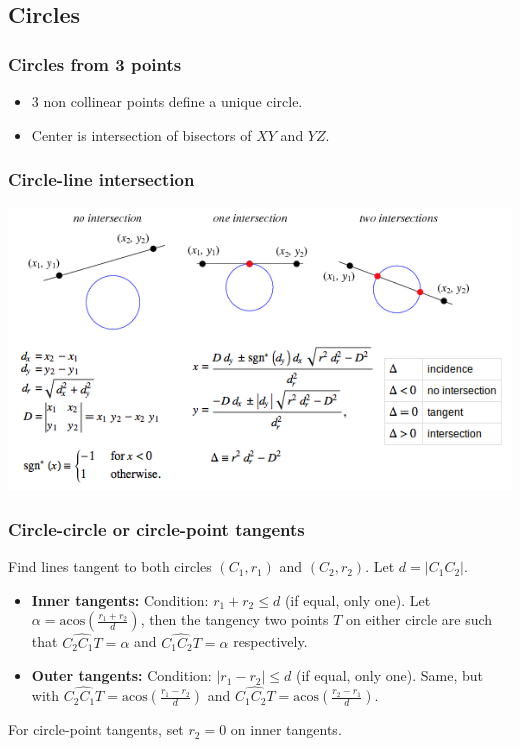 \subsection{Circles}

\subsubsection{Circles from 3 points}
\begin{itemize}
\item 3 non collinear points define a unique circle.
\item Center is intersection of bisectors of $XY$ and $YZ$. 
\end{itemize}

\subsubsection{Circle-line intersection}
\begin{center}
\includegraphics[scale=0.45]{Geometrie/circleLine.png}
\end{center}

\subsubsection{Circle-circle or circle-point tangents}
\newcommand{\acos}{\mbox{acos}}
Find lines tangent to both circles $(C_1,r_1)$ and $(C_2,r_2)$. Let $d = |C_1C_2|$.
\begin{itemize}
\item{\bf Inner tangents:} Condition: $r_1+r_2 \leq d$ (if equal, only one). Let $\alpha = \acos(\frac{r_1+r_2}{d})$, then the tangency two points $T$ on either circle are such that $\widehat{C_2C_1T}=\alpha$ and $\widehat{C_1C_2T}=\alpha$ respectively.
\item{\bf Outer tangents:} Condition: $|r_1-r_2| \leq d$ (if equal, only one). Same, but with $\widehat{C_2C_1T}=\acos(\frac{r_1-r_2}{d})$ and $\widehat{C_1C_2T}=\acos(\frac{r_2-r_1}{d})$.
\end{itemize}
For circle-point tangents, set $r_2=0$ on inner tangents.

